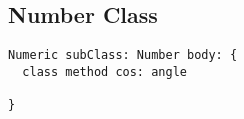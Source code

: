 \subsection{Number Class}

\begin{lstlisting}
Numeric subClass: Number body: {
  class method cos: angle
  
}
\end{lstlisting}